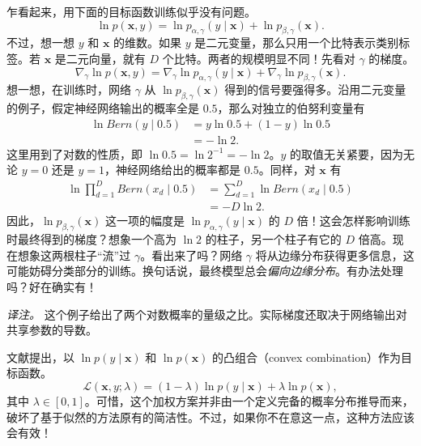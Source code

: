 乍看起来，用下面的目标函数训练似乎没有问题。
\begin{equation}
\ln p(\mathbf{x},y)=\ln p_{\alpha,\gamma}(y\mid\mathbf{x})+\ln p_{\beta,\gamma}(\mathbf{x}).
\tag{6.6}\label{eq:06-06}
\end{equation}
不过，想一想 $y$ 和 $\mathbf{x}$ 的维数。如果 $y$ 是二元变量，那么只用一个比特表示类别标签。若 $\mathbf{x}$ 是二元向量，就有 $D$ 个比特。两者的规模明显不同！先看对 $\gamma$ 的梯度。
\begin{equation}
\nabla_\gamma\ln p(\mathbf{x},y)=\nabla_\gamma\ln p_{\alpha,\gamma}(y\mid\mathbf{x})
+\nabla_\gamma\ln p_{\beta,\gamma}(\mathbf{x}).
\tag{6.7}\label{eq:06-07}
\end{equation}
想一想，在训练时，网络 $\gamma$ 从 $\ln p_{\beta,\gamma}(\mathbf{x})$ 得到的信号要强得多。沿用二元变量的例子，假定神经网络输出的概率全是 $0.5$，那么对独立的伯努利变量有
\begin{align*}
\ln\mathit{Bern}(y\mid0.5)&=y\ln 0.5+(1-y)\ln 0.5\\
&=-\ln 2.
\end{align*}
这里用到了对数的性质，即 $\ln 0.5=\ln 2^{-1}=-\ln 2$。$y$ 的取值无关紧要，因为无论 $y=0$ 还是 $y=1$，神经网络给出的概率都是 $0.5$。同样，对 $\mathbf{x}$ 有
\begin{align*}
\ln\prod_{d=1}^D\mathit{Bern}(x_d\mid0.5)&=\sum_{d=1}^D\ln\mathit{Bern}(x_d\mid0.5)\\
&=-D\ln 2.
\end{align*}
因此，$\ln p_{\beta,\gamma}(\mathbf{x})$ 这一项的幅度是 $\ln p_{\alpha,\gamma}(y\mid\mathbf{x})$ 的 $D$ 倍！这会怎样影响训练时最终得到的梯度？想象一个高为 $\ln 2$ 的柱子，另一个柱子有它的 $D$ 倍高。现在想象这两根柱子“流”过 $\gamma$。看出来了吗？网络 $\gamma$ 将从边缘分布获得更多信息，这可能妨碍分类部分的训练。换句话说，最终模型总会\emph{偏向边缘分布}。有办法处理吗？好在确实有！

\emph{译注。} 这个例子给出了两个对数概率的量级之比。实际梯度还取决于网络输出对共享参数的导数。

文献提出，以 $\ln p(y\mid\mathbf{x})$ 和 $\ln p(\mathbf{x})$ 的凸组合（convex combination）作为目标函数。
\begin{equation}
\mathcal{L}(\mathbf{x},y;\lambda)=(1-\lambda)\ln p(y\mid\mathbf{x})+\lambda\ln p(\mathbf{x}),
\tag{6.8}\label{eq:06-08}
\end{equation}
其中 $\lambda\in[0,1]$。可惜，这个加权方案并非由一个定义完备的概率分布推导而来，破坏了基于似然的方法原有的简洁性。不过，如果你不在意这一点，这种方法应该会有效！

